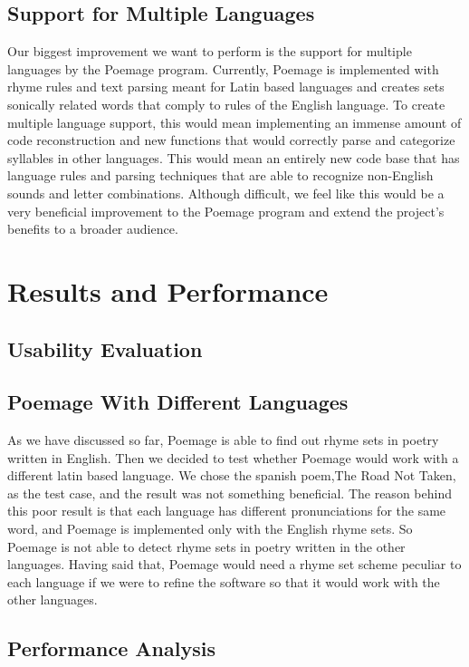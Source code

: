 \documentclass[journal]{vgtc}                %
\begin{document}
\subsection{Support for Multiple Languages}
Our biggest improvement we want to perform is the support for multiple languages by the Poemage program. Currently, Poemage is implemented with rhyme rules and text parsing meant for Latin based languages and creates sets sonically related words that comply to rules of the English language. To create multiple language support, this would mean implementing an immense amount of code reconstruction and new functions that would correctly parse and categorize syllables in other languages. This would mean an entirely new code base that has language rules and parsing techniques that are able to recognize non-English sounds and letter combinations. Although difficult, we feel like this would be a very beneficial improvement to the Poemage program and extend the project’s benefits to a broader audience.

\section{Results and Performance} \label{results}
\subsection{Usability Evaluation}
\subsection{Poemage With Different Languages}
As we have discussed so far, Poemage is able to find out rhyme sets in poetry written in English.  Then we  decided to test whether Poemage would work with a different latin based language. We chose the spanish poem,The Road Not Taken, as the test case, and the result was not something beneficial. The reason behind this poor result is that each language has different pronunciations for the same word, and Poemage is implemented only with the English rhyme sets. So Poemage is not able to detect rhyme sets in poetry written in the other languages. Having said that, Poemage would need a rhyme set scheme peculiar to each language if we were to refine the software so that it would work with the other languages.

\subsection{Performance Analysis}
\end{document}
